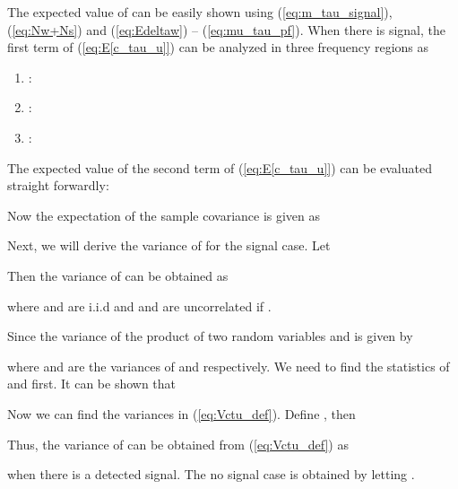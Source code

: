 \documentclass[draftclsnofoot,onecolumn,12pt]{IEEEtran}
\begin{document}
The expected value of  can be easily shown using (\ref{eq:m_tau_signal}), (\ref{eq:Nw+Ns}) and (\ref{eq:Edeltaw}) -- (\ref{eq:mu_tau_pf}).
  When there is signal, the first term of (\ref{eq:E[c_tau_u]}) can be analyzed in three frequency regions as \begin{enumerate}
    \item : ~
      

    \item :
      

    \item :
      

\end{enumerate}

  The expected value of the second term of (\ref{eq:E[c_tau_u]}) can be evaluated straight forwardly:
  

  Now the expectation of the sample covariance is given as
  



  Next, we will derive the variance of  for the signal case. Let
  
  Then the variance of  can be obtained as

where  and  are i.i.d and  and  are uncorrelated if .

Since the variance of the product of two random variables  and  is given by
  
  where  and  are the variances of  and  respectively. We need to find the statistics of  and  first. It can be shown that
  



  Now we can find the variances in (\ref{eq:Vctu_def}).
  Define , then



  Thus, the variance of  can be obtained from (\ref{eq:Vctu_def}) as
  
  when there is a detected signal. The no signal case  is obtained by letting .








\newpage
\end{document}
